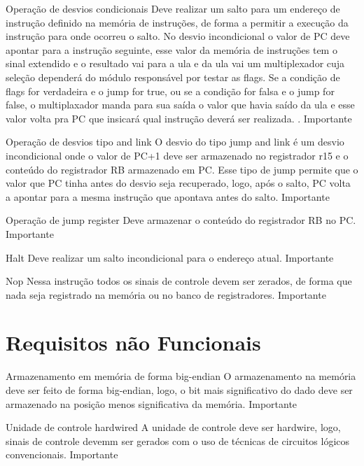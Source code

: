 \documentclass{report}
\begin{document}
\begin{functional}
       \requirement
      {Operação de desvios condicionais}
      {Deve realizar um salto para um endereço de instrução definido na memória de instruções, de forma a permitir a execução da instrução para onde ocorreu o salto. No desvio incondicional o valor de PC deve apontar para a instrução seguinte, esse valor da memória de instruções tem o sinal extendido e o resultado vai para a ula e da ula vai um multiplexador cuja seleção dependerá do módulo responsável por testar as flags. Se a condição de flags for verdadeira e o jump for true, ou se a condição for falsa e o jump for false, o multiplaxador manda para sua saída o valor que havia saído da ula e esse valor volta pra PC que insicará qual instrução deverá ser realizada.
.}
      {Importante}
      
      \requirement
      {Operação de desvios tipo and link}
      {O desvio do tipo jump and link é um desvio incondicional onde o valor de PC+1 deve ser armazenado no registrador r15 e o conteúdo do registrador RB armazenado em PC. Esse tipo de jump permite que o valor que PC tinha antes do desvio seja recuperado, logo, após o salto, PC volta a apontar para a mesma instrução que apontava antes do salto.}
      {Importante}
      
       \requirement
      {Operação de jump register}
      {Deve armazenar o conteúdo do registrador RB no PC.}
      {Importante}
      
      \requirement
      {Halt}
      {Deve realizar um salto incondicional para o endereço atual.}
      {Importante}
      
      \requirement
      {Nop}
      {Nessa instrução todos os sinais de controle devem ser zerados, de forma que nada seja registrado na memória ou no banco de registradores.}
      {Importante}
      
    \end{functional}

\section{Requisitos não Funcionais}

  \begin{nonfunctional}
    \requirement
    {Armazenamento em memória de forma big-endian}
    {O armazenamento na memória deve ser feito de forma big-endian, logo, o bit mais significativo do dado deve ser armazenado na posição menos significativa da memória.}
    {Importante}

    \requirement
    {Unidade de controle hardwired}
    {A unidade de controle deve ser hardwire, logo, sinais de controle devemm ser gerados com o uso de técnicas de circuitos lógicos convencionais.}
    {Importante}
  \end{nonfunctional}


% 
% 
\end{document}
